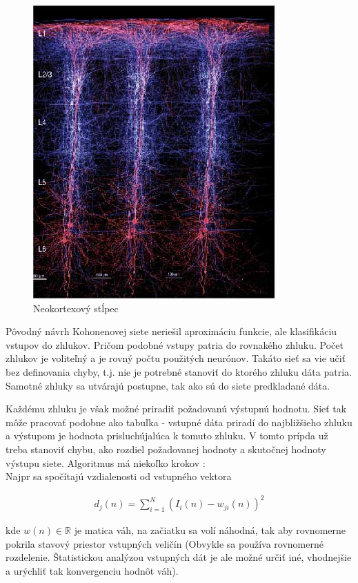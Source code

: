 \begin{figure}[]
\center
\includegraphics[scale=.4]{../pictures/cortical_column.jpg}
\caption{Neokortexový stĺpec}
\label{img:cortical_column}
\end{figure}

Pôvodný návrh Kohonenovej siete neriešil aproximáciu funkcie, ale klasifikáciu
vstupov do zhlukov. Pričom podobné vstupy patria do rovnakého zhluku. Počet zhlukov
je voliteľný a je rovný počtu použitých neurónov. Takáto sieť sa vie učiť bez
definovania chyby, t.j. nie je potrebné stanoviť do ktorého zhluku dáta patria. Samotné
zhluky sa utvárajú postupne, tak ako sú do siete predkladané dáta.

Každému zhluku je však možné priradiť požadovanú výstupnú hodnotu. Sieť tak môže
pracovať podobne ako tabuľka - vstupné dáta priradí do najbližšieho zhluku a výstupom
je hodnota prisluchújalúca k tomuto zhluku. V tomto prípda už treba stanoviť chybu,
ako rozdiel požadovanej hodnoty a skutočnej hodnoty výstupu siete.
Algoritmus má niekoľko krokov :
\\
Najpr sa spočítajú vzdialenosti od vstupného vektora

\begin{align}
d_j(n) = \sum\limits_{i=1}^{N}{(I_i(n) - w_{ji}(n))^2}
\label{eq:knn_distance}
\end{align}

kde $w(n) \in \mathbb{R}$ je matica váh, na začiatku sa volí náhodná, tak
aby rovnomerne pokrila stavový priestor vstupných veličín (Obvykle sa používa rovnomerné
rozdelenie. Štatistickou analýzou vstupných dát je ale možné určiť iné, vhodnejšie
a urýchliť tak konvergenciu hodnôt váh).

